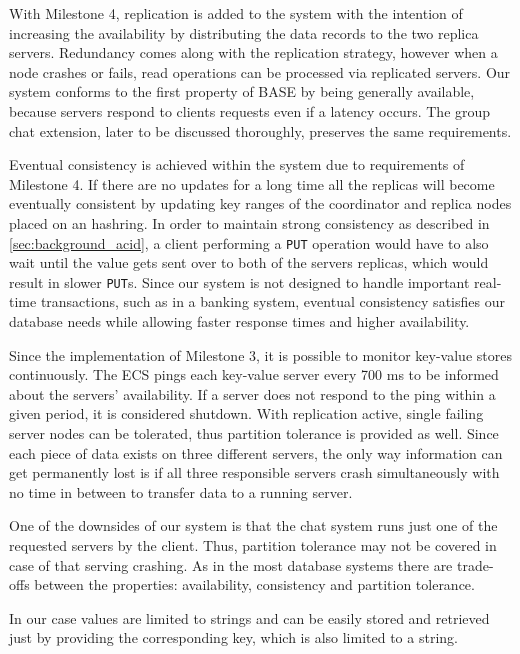 With Milestone 4, replication is added to the system with the intention of increasing the availability by distributing the data records to the two replica servers. Redundancy comes along with the replication strategy, however when a node crashes or fails, read operations can be processed via replicated servers.
Our system conforms to the first property of BASE by being generally available, because servers respond to clients requests even if a latency occurs. The group chat extension, later to be discussed thoroughly, preserves the same requirements.

Eventual consistency is achieved within the system due to requirements of Milestone 4. If there are no updates for a long time all the replicas will become eventually consistent by updating key ranges of the coordinator and replica nodes placed on an hashring. In order to maintain strong consistency as described in \ref{sec:background_acid}, a client performing a \texttt{PUT} operation would have to also wait until the value gets sent over to both of the servers replicas, which would result in slower \texttt{PUT}s. Since our system is not designed to handle important real-time transactions, such as in a banking system, eventual consistency satisfies our database needs while allowing faster response times and higher availability. 

Since the implementation of Milestone 3, it is possible to monitor key-value stores continuously. The ECS pings each key-value server every 700 ms to be informed about the servers’ availability. If a server does not respond to the ping within a given period, it is considered shutdown. With replication active, single failing server nodes can be tolerated, thus partition tolerance is provided as well. Since each piece of data exists on three different servers, the only way information can get permanently lost is if all three responsible servers crash simultaneously with no time in between to transfer data to a running server.

One of the downsides of our system is that the chat system runs just one of the requested servers by the client. Thus, partition tolerance may not be covered in case of that serving crashing. As in the most database systems there are trade-offs between the properties: availability, consistency and partition tolerance.

In our case values are limited to strings and can be easily stored and retrieved just by providing the corresponding key, which is also limited to a string.


